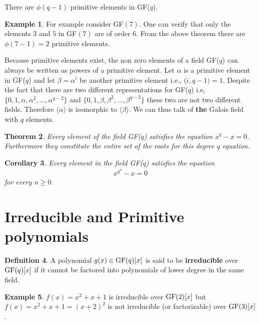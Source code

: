\documentclass[12pt]{article}
\newtheorem{thm}{Theorem}
\newtheorem{cor}[thm]{Corollary}
\theoremstyle{definition}
\newtheorem{defn}[thm]{Definition}
\newtheorem{exmp}[thm]{Example}
\begin{document}
\begin{theorem}
\label{Thm:NumPrimitiveElements}
There are $\phi(q-1)$ primitive elements in GF($q$).
\end{theorem}

\begin{exmp}
For example consider GF$(7)$. One can verify that only the elements $3$ and $5$ in GF$(7)$ are of order $6$. From the above theorem there are $\phi(7-1)=2$ primitive elements. 
\end{exmp}

Because primitive elements exist, the non zero elements of a field GF($q$) can always be written as powers of a primitive element. Let $\alpha$ is a primitive element in GF($q$) and let $\beta=\alpha^i $ be another primitive element i.e., ($i,q-1)=1$. Despite the fact that there are two different representations for GF($q$) i.e, $\{0,1,\alpha,\alpha^2,\ldots,\alpha^{q-2}\}$ and  $\{0,1,\beta,\beta^2,\ldots,\beta^{q-2}\}$ these two are not two different fields. Therefore $\langle \alpha \rangle$ is isomorphic to $\langle \beta \rangle$. We can thus talk of \textbf{the} Galois field with $q$ elements.

\begin{thm}
\label{Thm:GFqEquation}
Every element of the field GF($q$) satisfies the equation $x^q-x=0$. Furthermore they constitute the entire set of the roots for this degree $q$ equation.
\end{thm}

\begin{cor}
\label{Thm:GFqEquationCorollary}
Every element in the field GF($q$) satisfies the equation 
\begin{align*}
x^{q^{n}}-x=0 
\end{align*}
for every $n\geq 0$.
\end{cor}



\section{Irreducible and Primitive polynomials}
\begin{defn}
A polynomial $g(x)\in\text{GF}(q) [x]$ is said to be \textbf{irreducible} over $\text{GF}(q)[x]$ if it cannot be factored into polynomials of lower degree in the same field.
\end{defn}
\begin{exmp}
$f(x)=x^2+x+1$ is irreducible over $\text{GF}(2)[x]$ but $f(x)=x^2+x+1=(x+2)^2$  is not irreducible (or factorizable) over $\text{GF}(3)[x]$.
\end{exmp}
\end{document}
